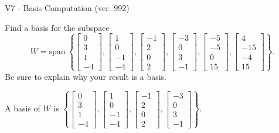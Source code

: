 \begin{exercise}
  \begin{exerciseTitle}V7 - Basis Computation (ver. 992)\end{exerciseTitle}
  \begin{exerciseStatement}
    Find a basis for the subspace 
\[W=\mathrm{span}\ \left\{\left[\begin{array}{r}
0 \\
3 \\
1 \\
-4
\end{array}\right] , \left[\begin{array}{r}
1 \\
0 \\
-1 \\
-4
\end{array}\right] , \left[\begin{array}{r}
-1 \\
2 \\
0 \\
2
\end{array}\right] , \left[\begin{array}{r}
-3 \\
0 \\
3 \\
-1
\end{array}\right] , \left[\begin{array}{r}
-5 \\
-5 \\
0 \\
15
\end{array}\right] , \left[\begin{array}{r}
4 \\
-15 \\
-4 \\
15
\end{array}\right]\right\}.\]
 Be sure to explain why your result is a basis.


  \end{exerciseStatement}
  \begin{exerciseAnswer}
   A basis of \(W\) is  \(\left\{\left[\begin{array}{r}
0 \\
3 \\
1 \\
-4
\end{array}\right] , \left[\begin{array}{r}
1 \\
0 \\
-1 \\
-4
\end{array}\right] , \left[\begin{array}{r}
-1 \\
2 \\
0 \\
2
\end{array}\right] , \left[\begin{array}{r}
-3 \\
0 \\
3 \\
-1
\end{array}\right]\right\}\).
  


  \end{exerciseAnswer}
\end{exercise}